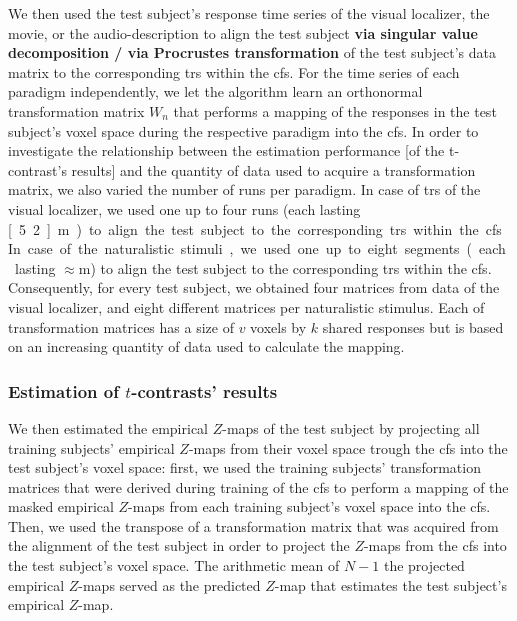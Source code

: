 %
We then used the test subject's response time series of the visual localizer,
the movie, or the audio-description to align the test subject \textbf{via
singular value decomposition / via Procrustes transformation} of the test
subject's data matrix to the corresponding \acp{tr} within the \ac{cfs}.
%
For the time series of each paradigm independently, we let the algorithm learn
an orthonormal transformation matrix $W_{n}$ that performs a mapping of the
responses in the test subject's voxel space during the respective paradigm into
the \ac{cfs}.
%
In order to investigate the relationship between the estimation performance [of
the t-contrast's results] and the quantity of data used to acquire a
transformation matrix, we also varied the number of runs per paradigm.
%
In case of \acp{tr} of the visual localizer, we used one up to four runs (each
lasting \unit[5.2]{m}) to align the test subject to the corresponding \acp{tr}
within the \ac{cfs}.
%
In case of the naturalistic stimuli, we used one up to eight segments (each
lasting $\approx$\unit[15]{m}) to align the test subject to the corresponding
\acp{tr} within the \ac{cfs}.
%
Consequently, for every test subject, we obtained four matrices from data of the
visual localizer, and eight different matrices per naturalistic stimulus.
%
Each of transformation matrices has a size of $v$ voxels by $k$ shared responses
but is based on an increasing quantity of data used to calculate the mapping.


\subsubsection{Estimation of $t$-contrasts' results}

We then estimated the empirical $Z$-maps of the test subject by projecting all
training subjects' empirical $Z$-maps from their voxel space trough the \ac{cfs}
into the test subject's voxel space:
first, we used the training subjects' transformation matrices that were derived
during training of the \ac{cfs} to perform a mapping of the masked empirical
$Z$-maps from each training subject's voxel space into the \ac{cfs}.
Then, we used the transpose of a transformation matrix that was acquired from
the alignment of the test subject in order to project the $Z$-maps from the
\ac{cfs} into the test subject's voxel space.
The arithmetic mean of $N-1$ the projected empirical $Z$-maps served as the
predicted $Z$-map that estimates the test subject's empirical $Z$-map.




